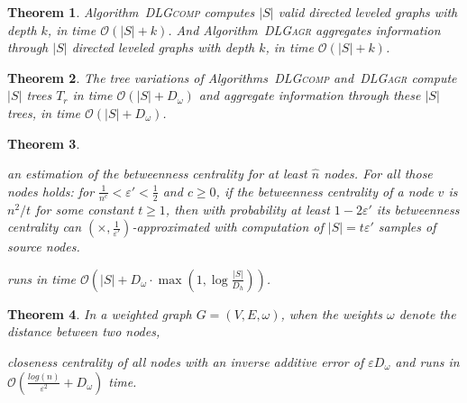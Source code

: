 \documentclass[11pt]{article}
\newcommand{\BO}{\mathcal{O}}
\newtheorem{theorem}{Theorem}[section]
\renewcommand{\epsilon}{\varepsilon}
\newif\iffull
\newif\ifshort
\begin{document}
\begin{theorem}\label{theo:DLGruntime}
Algorithm\iffull~\ref{alg:DLGcomp}\fi~\textsc{DLGcomp} computes $|S|$ valid directed leveled graphs with depth $k$, in time $\BO(|S|+k)$. And Algorithm\iffull~\ref{alg:DLGagr}\fi~\textsc{DLGagr} aggregates information through $|S|$ directed leveled graphs with depth $k$, in time $\BO(|S|+k)$.
\end{theorem}

\begin{theorem}\label{theo:tree}
The tree variations of Algorithms\iffull~\ref{alg:DLGcomp}\fi~\textsc{DLGcomp} and\iffull~\ref{alg:DLGagr}\fi~\textsc{DLGagr} compute $|S|$ trees $T_r$ in time $\BO(|S|+D_\omega)$ and aggregate information through these $|S|$ trees, in time $\BO(|S|+D_\omega)$.
\end{theorem}

\begin{theorem}\label{theo:bcapprox}
\ifshort
One can compute 
\fi
\iffull
Algorithm \ref{alg:BC_setup_controlling} computes 
\fi
an estimation of the betweenness centrality for at least $\hat{n}$ nodes. For all those nodes holds: for $\frac{1}{n^c}<\epsilon'<\frac{1}{2}$ and $c\geq0$, if the betweenness centrality of a node $v$ is $n^2/t$ for some constant $t\geq 1$, then with probability at least $ 1-2\epsilon'$ its betweenness centrality can  $(\times,\frac{1}{\epsilon'})$-approximated with computation of $|S|=t\epsilon'$ samples of source nodes. 
\ifshort
This algorithm 
\fi
\iffull
Algorithm \ref{alg:BC_setup_controlling} 
\fi
 runs in time $\BO\left(|S|+D_\omega\cdot\max\left(1,\log\frac{|S|}{D_h}\right)\right)$.
\end{theorem}

\begin{theorem}\label{theo:ccapprox}
In a weighted graph $G=(V,E,\omega)$, when the weights $\omega$ denote the distance between two nodes, 
\ifshort
one can approximate 
\fi
\iffull
Algorithm \ref{alg:CC} approximates 
\fi
closeness centrality of all nodes with an inverse additive error of $\epsilon D_\omega$ and runs in $\BO\left(\frac{log(n)}{\epsilon^2}+D_\omega\right)$ time.
\end{theorem}
\end{document}
